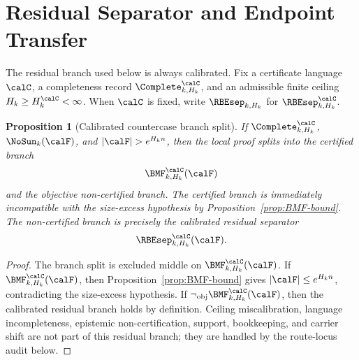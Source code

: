 \documentclass[11pt]{article}
\newtheorem{proposition}[theorem]{Proposition}
\begin{document}
\section{Residual Separator and Endpoint Transfer}

The residual branch used below is always calibrated.  Fix a certificate language \(\calC\), a completeness record \(\Complete^{\calC}_{k,H_k}\), and an admissible finite ceiling \(H_k\ge H_k^{\calC}<\infty\).  When \(\calC\) is fixed, write \(\RBEsep_{k,H_k}\) for \(\RBEsep^{\calC}_{k,H_k}\).

\begin{proposition}[Calibrated countercase branch split]
\label{prop:countercase-dichotomy}
If \(\Complete^{\calC}_{k,H_k}\), \(\NoSun_k(\calF)\), and \(|\calF|>e^{H_k n}\), then the local proof splits into the certified branch
\[
  \BMF^{\calC}_{k,H_k}(\calF)
\]
and the objective non-certified branch.  The certified branch is immediately incompatible with the size-excess hypothesis by Proposition~\ref{prop:BMF-bound}.  The non-certified branch is precisely the calibrated residual separator
\[
  \RBEsep^{\calC}_{k,H_k}(\calF).
\]
\end{proposition}

\begin{proof}
The branch split is excluded middle on \(\BMF^{\calC}_{k,H_k}(\calF)\).  If \(\BMF^{\calC}_{k,H_k}(\calF)\), then Proposition~\ref{prop:BMF-bound} gives \(|\calF|\le e^{H_k n}\), contradicting the size-excess hypothesis.  If \(\neg_{\mathrm{obj}}\BMF^{\calC}_{k,H_k}(\calF)\), then the calibrated residual branch holds by definition.  Ceiling miscalibration, language incompleteness, epistemic non-certification, support, bookkeeping, and carrier shift are not part of this residual branch; they are handled by the route-locus audit below.
\end{proof}
\end{document}
